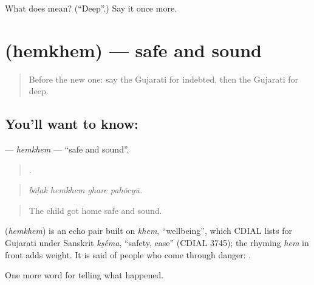 \begin{tcolorbox}[breakable,colback=teal!4,colframe=teal!35!black,title={Before you move on}]
What does  mean? (\textquotedblleft{}Deep\textquotedblright{}.) Say it once more.
\end{tcolorbox}
\section[\texorpdfstring{\gu{હેમખેમ} (hemkhem)}{હેમખેમ (hemkhem)}]{ (hemkhem) — safe and sound}

\label{lesson:GU-C307-hemkhem}



\begin{quote}
Before the new one: say the Gujarati for indebted, then the Gujarati for deep.
\end{quote}

\subsection*{You'll want to know: }
\textbf{} — \emph{hemkhem} — \textquotedblleft{}safe and sound\textquotedblright{}.

\begin{quote}
   .
\end{quote}

\begin{quote}
\emph{bāḷak hemkhem ghare pahõcyũ.}
\end{quote}

\begin{quote}
The child got home safe and sound.
\end{quote}

\begin{cousinweb}
\textbf{} (\emph{hemkhem}) is an echo pair built on \emph{khem}, \textquotedblleft{}wellbeing\textquotedblright{}, which CDIAL lists for Gujarati under Sanskrit \emph{kṣ\'{\={e}}ma}, \textquotedblleft{}safety, ease\textquotedblright{} (CDIAL 3745); the rhyming \emph{hem} in front adds weight. It is said of people who come through danger: \textbf{ }.
\end{cousinweb}

\begin{grammarlens}[title={What you've built}]
One more word for telling what happened.
\end{grammarlens}

